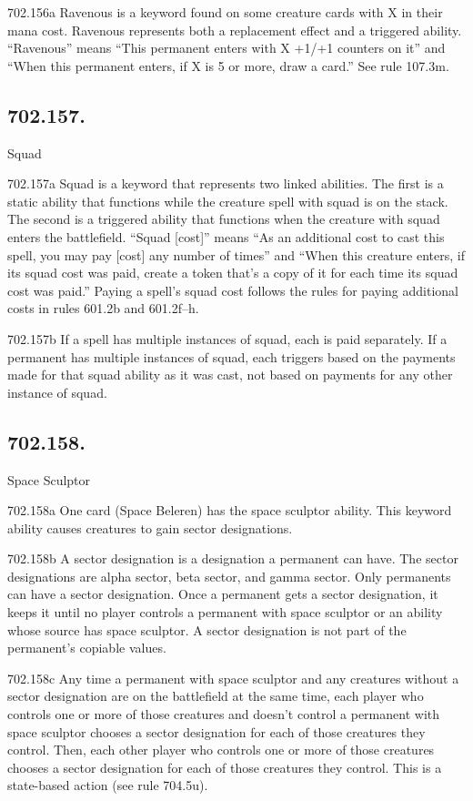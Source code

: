 702.156a Ravenous is a keyword found on some creature cards with {X} in their mana cost. Ravenous represents both a replacement effect and a triggered ability. “Ravenous” means “This permanent enters with X +1/+1 counters on it” and “When this permanent enters, if X is 5 or more, draw a card.” See rule 107.3m.

\subsection*{702.157.}
Squad

702.157a Squad is a keyword that represents two linked abilities. The first is a static ability that functions while the creature spell with squad is on the stack. The second is a triggered ability that functions when the creature with squad enters the battlefield. “Squad [cost]” means “As an additional cost to cast this spell, you may pay [cost] any number of times” and “When this creature enters, if its squad cost was paid, create a token that’s a copy of it for each time its squad cost was paid.” Paying a spell’s squad cost follows the rules for paying additional costs in rules 601.2b and 601.2f–h.

702.157b If a spell has multiple instances of squad, each is paid separately. If a permanent has multiple instances of squad, each triggers based on the payments made for that squad ability as it was cast, not based on payments for any other instance of squad.

\subsection*{702.158.}
Space Sculptor

702.158a One card (Space Beleren) has the space sculptor ability. This keyword ability causes creatures to gain sector designations.

702.158b A sector designation is a designation a permanent can have. The sector designations are alpha sector, beta sector, and gamma sector. Only permanents can have a sector designation. Once a permanent gets a sector designation, it keeps it until no player controls a permanent with space sculptor or an ability whose source has space sculptor. A sector designation is not part of the permanent’s copiable values.

702.158c Any time a permanent with space sculptor and any creatures without a sector designation are on the battlefield at the same time, each player who controls one or more of those creatures and doesn’t control a permanent with space sculptor chooses a sector designation for each of those creatures they control. Then, each other player who controls one or more of those creatures chooses a sector designation for each of those creatures they control. This is a state-based action (see rule 704.5u).

